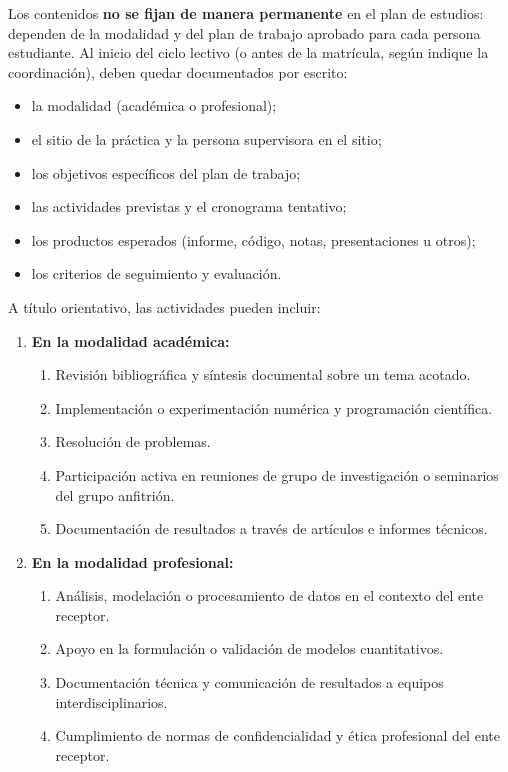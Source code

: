 \begin{refsection}
Los contenidos \textbf{no se fijan de manera permanente} en el plan de estudios: dependen de la modalidad y del plan de trabajo aprobado para cada persona estudiante. Al inicio del ciclo lectivo (o antes de la matrícula, según indique la coordinación), deben quedar documentados por escrito:

\begin{itemize}
\item la modalidad (académica o profesional);
\item el sitio de la práctica y la persona supervisora en el sitio;
\item los objetivos específicos del plan de trabajo;
\item las actividades previstas y el cronograma tentativo;
\item los productos esperados (informe, código, notas, presentaciones u otros);
\item los criterios de seguimiento y evaluación.
\end{itemize}

A título orientativo, las actividades pueden incluir:

\begin{enumerate}
\item \textbf{En la modalidad académica:}
\begin{enumerate}
    \item Revisión bibliográfica y síntesis documental sobre un tema acotado.
    \item Implementación o experimentación numérica y programación científica.
    \item Resolución de problemas.
    \item Participación activa en reuniones de grupo de investigación o seminarios del grupo anfitrión.
    \item Documentación de resultados a través de artículos e informes técnicos.
\end{enumerate}

\item \textbf{En la modalidad profesional:}
\begin{enumerate}
    \item Análisis, modelación o procesamiento de datos en el contexto del ente receptor.
    \item Apoyo en la formulación o validación de modelos cuantitativos.
    \item Documentación técnica y comunicación de resultados a equipos interdisciplinarios.
    \item Cumplimiento de normas de confidencialidad y ética profesional del ente receptor.
\end{enumerate}
\end{enumerate}


\end{refsection}
